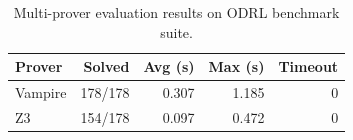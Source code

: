 \begin{table}[t]
\centering
\caption{Multi-prover evaluation results on ODRL benchmark suite.}
\label{tab:prover-results}
\small
\begin{tabular}{lrrrr}
\toprule
\textbf{Prover} & \textbf{Solved} & \textbf{Avg (s)} & \textbf{Max (s)} & \textbf{Timeout} \\
\midrule
Vampire & 178/178 & 0.307 & 1.185 & 0 \\
Z3 & 154/178 & 0.097 & 0.472 & 0 \\
\bottomrule
\end{tabular}
\end{table}